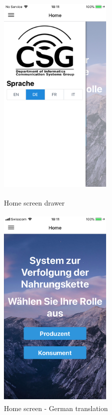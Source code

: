 \begin{figure}[!h]
	\centering
	\begin{minipage}[t]{4cm}
		\centering
		\includegraphics[width=5.5cm, height=10cm]{figures/app-2.PNG}
		\caption{Home screen drawer}
		\label{fig:app-drawer}
	\end{minipage}
	\hspace{3cm}
	\begin{minipage}[t]{4cm}
		\centering
		\includegraphics[width=5.5cm, height=10cm]{figures/app-4.PNG}
		\caption{Home screen - German translation}
		\label{fig:app-homescreen-german}
	\end{minipage}
\end{figure}


